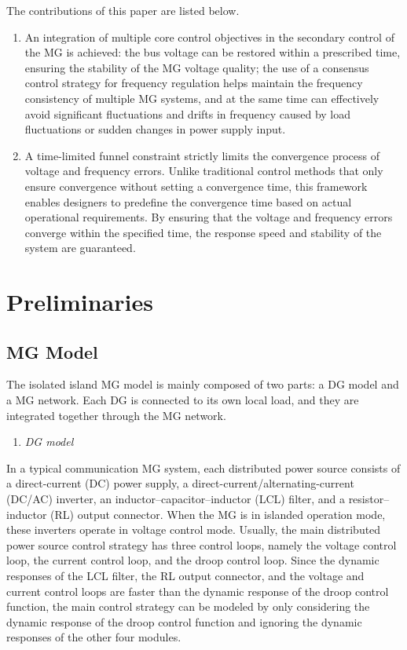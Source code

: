 \documentclass[]{interact}
\theoremstyle{plain}%
\theoremstyle{definition}
\theoremstyle{remark}
\begin{document}
The contributions of this paper are listed below.
\begin{enumerate}  
    \item An integration of multiple core control objectives in the secondary control of the MG is achieved: the bus voltage can be restored within a prescribed time, ensuring the stability of the MG voltage quality; the use of a consensus control strategy for frequency regulation helps maintain the frequency consistency of multiple MG systems, and at the same time can effectively avoid significant fluctuations and drifts in frequency caused by load fluctuations or sudden changes in power supply input.
    \item A time-limited funnel constraint strictly limits the convergence process of voltage and frequency errors. Unlike traditional control methods \citep{Chang2024,Fei2023,Wei2023} that only ensure convergence without setting a convergence time, this framework enables designers to predefine the convergence time based on actual operational requirements. By ensuring that the voltage and frequency errors converge within the specified time, the response speed and stability of the system are guaranteed.
\end{enumerate}

\section{Preliminaries}

\subsection{MG Model}
The isolated island MG model is mainly composed of two parts: a DG model and a MG network. 
Each DG is connected to its own local load, and they are integrated together through the MG network. 

\begin{enumerate}
\item \textit{DG model}\end{enumerate} 

In a typical communication MG system, each distributed power source consists of a direct-current (DC) power supply, a direct-current/alternating-current (DC/AC) inverter, an inductor–capacitor–inductor (LCL) filter, and a resistor–inductor (RL) output connector. When the MG is in islanded operation mode, these inverters operate in voltage control mode. Usually, the main distributed power source control strategy has three control loops, namely the voltage control loop, the current control loop, and the droop control loop. Since the dynamic responses of the LCL filter, the RL output connector, and the voltage and current control loops are faster than the dynamic response of the droop control function, the main control strategy can be modeled by only considering the dynamic response of the droop control function and ignoring the dynamic responses of the other four modules.
\end{document}
